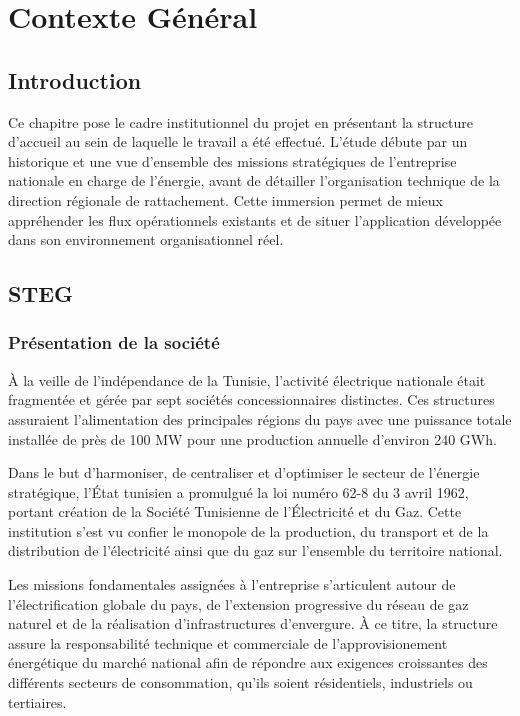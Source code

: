 \chapter{Contexte Général}

\section{Introduction}

Ce chapitre pose le cadre institutionnel du projet en présentant la structure d’accueil au sein de laquelle le travail a été effectué. L'étude débute par un historique et une vue d'ensemble des missions stratégiques de l'entreprise nationale en charge de l'énergie, avant de détailler l'organisation technique de la direction régionale de rattachement. Cette immersion permet de mieux appréhender les flux opérationnels existants et de situer l'application développée dans son environnement organisationnel réel.

\section{STEG}

\subsection{Présentation de la société}

À la veille de l'indépendance de la Tunisie, l'activité électrique nationale était fragmentée et gérée par sept sociétés concessionnaires distinctes. Ces structures assuraient l'alimentation des principales régions du pays avec une puissance totale installée de près de 100 MW pour une production annuelle d'environ 240 GWh. 

Dans le but d'harmoniser, de centraliser et d'optimiser le secteur de l'énergie stratégique, l'État tunisien a promulgué la loi numéro 62-8 du 3 avril 1962, portant création de la Société Tunisienne de l'Électricité et du Gaz. Cette institution s'est vu confier le monopole de la production, du transport et de la distribution de l'électricité ainsi que du gaz sur l'ensemble du territoire national.

Les missions fondamentales assignées à l'entreprise s'articulent autour de l'électrification globale du pays, de l'extension progressive du réseau de gaz naturel et de la réalisation d'infrastructures d'envergure. À ce titre, la structure assure la responsabilité technique et commerciale de l'approvisionement énergétique du marché national afin de répondre aux exigences croissantes des différents secteurs de consommation, qu'ils soient résidentiels, industriels ou tertiaires.

